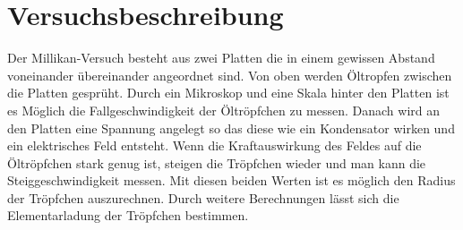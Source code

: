 \section*{Versuchsbeschreibung}
Der Millikan-Versuch besteht aus zwei Platten die in einem gewissen Abstand voneinander übereinander angeordnet sind. Von oben werden Öltropfen zwischen die Platten gesprüht. Durch ein Mikroskop und eine Skala hinter den Platten ist es Möglich die Fallgeschwindigkeit der Öltröpfchen zu messen. Danach wird an den Platten eine Spannung angelegt so das diese wie ein Kondensator wirken und ein elektrisches Feld entsteht. Wenn die Kraftauswirkung des Feldes auf die Öltröpfchen stark genug ist, steigen die Tröpfchen wieder und man kann die Steiggeschwindigkeit messen. Mit diesen beiden Werten ist es möglich den Radius der Tröpfchen auszurechnen. Durch weitere Berechnungen lässt sich die Elementarladung der Tröpfchen bestimmen.
